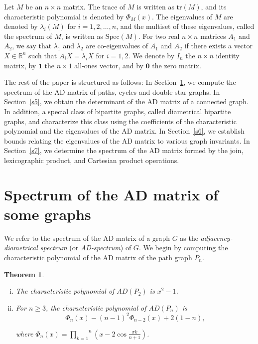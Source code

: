 \documentclass[12pt]{article}
\numberwithin{equation}{section}
\newtheorem{thm}{Theorem}[section]
\begin{document}
	
	
	Let $M$ be an $n \times n$ matrix. The trace of $M$ is written as $\mbox{tr}(M)$, and its characteristic polynomial is denoted by $\Phi_M(x)$. The eigenvalues of $M$ are denoted by $\lambda_i(M)$ for $i = 1,2,\dots,n$, and the multiset of these eigenvalues, called the spectrum of $M$, is written as $\mbox{Spec}(M)$.	For two real $n \times n$ matrices $A_1$ and $A_2$, we say that $\lambda_1$ and $\lambda_2$ are co-eigenvalues of $A_1$ and $A_2$ if there exists a vector $X \in \mathbb{R}^n$ such that
	$A_i X = \lambda_i X$ for $i = 1,2$.	We denote by $I_n$ the $n \times n$ identity matrix, by $\mathbf{1}$ the $n \times 1$ all-ones vector, and by $\mathbf{0}$ the zero matrix.
	
	 
	 
	 The rest of the paper is structured as follows: In Section~\ref{s4}, we compute the  spectrum of the AD matrix of  paths, cycles and double star graphs. In Section~\ref{s5}, we obtain the determinant of the AD matrix of a connected graph.  In addition, a special class of bipartite graphs, called diametrical bipartite graphs, and characterize this class using the coefficients of the characteristic polynomial and the eigenvalues of the AD matrix. In Section~\ref{s6}, we establish bounds relating the eigenvalues of the AD matrix to various graph invariants. In Section~\ref{s7}, we determine the spectrum of the AD matrix formed by the join, lexicographic product, and Cartesian product operations.

	


	\section{Spectrum of the AD matrix of some graphs}\label{s4}
		We refer to the spectrum of the AD matrix of a graph $G$ as the \textit{adjacency-diametrical spectrum} (or \textit{AD-spectrum}) of $G$. We begin by computing the characteristic polynomial of the AD matrix of the path graph $P_n$.
	\begin{thm}
		\begin{enumerate}[(i)]
			\item  The characteristic polynomial of $AD(P_2)$ is $x^2-1$. 
			\item  For $n \geq 3 $, the characteristic polynomial of $AD(P_n)$ is 
			\[  \Phi_{n}(x) -(n-1)^2\Phi_{n-2}(x)+2(1-n),\]
			
			where $ \Phi_{n}(x)=\overset{n}{\underset{k=1}{\prod}} \left(x-2 \cos \frac{\pi k}{n+1}\right)$.
		\end{enumerate}
	\end{thm}
	
\end{document}
